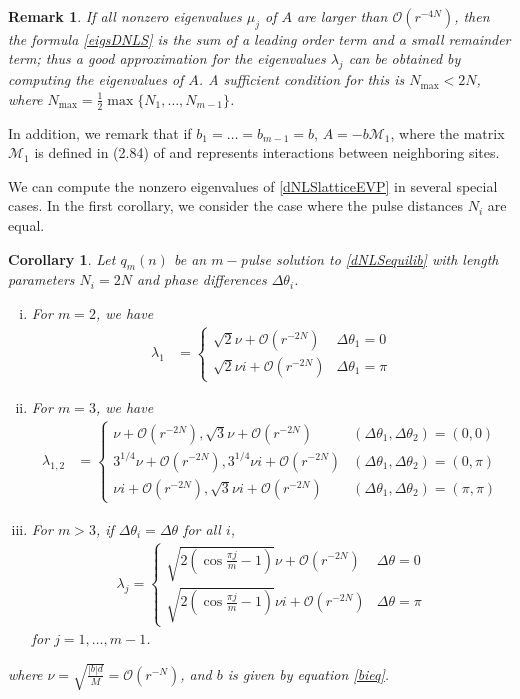 \documentclass[12pt]{article}
\newtheorem{corollary}{Corollary}
\newtheorem{remark}{Remark}
\begin{document}
\begin{remark}
If all nonzero eigenvalues $\mu_j$ of $A$ are larger than $\mathcal{O}(r^{-4N})$, then the formula \eqref{eigsDNLS} is the sum of a leading order term and a small remainder term; thus a good approximation for the eigenvalues $\lambda_j$ can be obtained by computing the eigenvalues of $A$. A sufficient condition for this is $N_{\mathrm{max}} < 2 N$, where $N_{\mathrm{max}} = \frac{1}{2} \max\{ N_1, \dots, N_{m-1}\}$.
\end{remark}

In addition, we remark that if $b_1 = \dots = b_{m-1} = b$, $A = -b \mathcal{M}_1$, where the matrix $\mathcal{M}_1$ is defined in (2.84) of \cite{Kevrekidis2009} and represents interactions between neighboring sites.

We can compute the nonzero eigenvalues of \eqref{dNLSlatticeEVP} in several special cases. In the first corollary, we consider the case where the pulse distances $N_i$ are equal.

\begin{corollary}\label{dNLSeigcorr}Let $q_m(n)$ be an $m-$pulse solution to \eqref{dNLSequilib} with length parameters $N_i = 2N$ and phase differences $\Delta\theta_i$.
\begin{enumerate}[(i)]
\item For $m = 2$, we have
\begin{align}\label{2pulseeigs}
\lambda_1 &= 
\begin{cases}
\sqrt{2}\nu  + \mathcal{O}(r^{-2N}) & \Delta\theta_1 = 0 \\
\sqrt{2}\nu i + \mathcal{O}(r^{-2N}) & \Delta\theta_1 = \pi
\end{cases}
\end{align}
\item For $m = 3$, we have
\begin{align}\label{3pulseequaleigs}
\lambda_{1, 2} &= \begin{cases}
\nu + \mathcal{O}(r^{-2N}), \sqrt{3} \nu + \mathcal{O}(r^{-2N}) & (\Delta\theta_1, \Delta\theta_2) = (0, 0) \\
3^{1/4}\nu + \mathcal{O}(r^{-2N}) , 3^{1/4}\nu i + \mathcal{O}(r^{-2N}) & (\Delta\theta_1, \Delta\theta_2) = (0, \pi) \\
\nu i + \mathcal{O}(r^{-2N}), \sqrt{3} \nu i + \mathcal{O}(r^{-2N}) & (\Delta\theta_1, \Delta\theta_2) = (\pi, \pi)
\end{cases}
\end{align}
\item For $m > 3$, if $\Delta\theta_i = \Delta\theta$ for all $i$,
\begin{align*}
\lambda_j = \begin{cases}
\sqrt{2\left( \cos\frac{\pi j}{m} - 1 \right)}\nu + \mathcal{O}(r^{-2N}) & \Delta\theta = 0 \\
\sqrt{2\left( \cos\frac{\pi j}{m} - 1 \right)}\nu i + \mathcal{O}(r^{-2N}) & \Delta\theta = \pi
\end{cases}
\end{align*}
for $j = 1, \dots, m-1$.
\end{enumerate}
where $\nu = \sqrt{\frac{|b|d}{M}} = \mathcal{O}(r^{-N})$, and $b$ is given by equation \eqref{bieq}.
\end{corollary}
\end{document}
